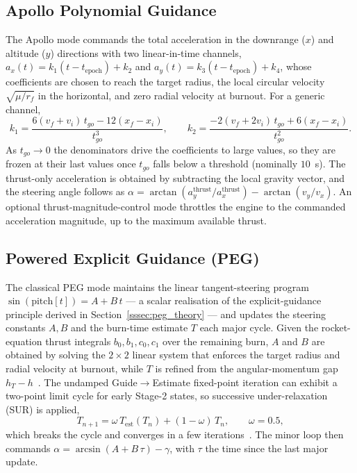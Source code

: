 \subsection{Apollo Polynomial Guidance}
\label{ssec:apollo}

The Apollo mode commands the total acceleration in the downrange ($x$) and
altitude ($y$) directions with two linear-in-time channels,
$a_x(t)=k_1(t-t_{\mathrm{epoch}})+k_2$ and
$a_y(t)=k_3(t-t_{\mathrm{epoch}})+k_4$, whose coefficients are chosen to reach
the target radius, the local circular velocity $\sqrt{\mu/r_f}$ in the horizontal,
and zero radial velocity at burnout. For a generic channel,
\begin{equation}
  k_1 = \frac{6(v_f+v_i)\,t_{go} - 12(x_f-x_i)}{t_{go}^{3}}, \qquad
  k_2 = \frac{-2(v_f+2v_i)\,t_{go} + 6(x_f-x_i)}{t_{go}^{2}}.
  \label{eq:apollo_k}
\end{equation}
As $t_{go}\to0$ the denominators drive the coefficients to large values, so they
are frozen at their last values once $t_{go}$ falls below a threshold (nominally
$10$~s). The thrust-only acceleration is obtained by subtracting the local gravity
vector, and the steering angle follows as
$\alpha=\arctan(a_y^{\mathrm{thrust}}/a_x^{\mathrm{thrust}})-\arctan(v_y/v_x)$. An
optional thrust-magnitude-control mode throttles the engine to the commanded
acceleration magnitude, up to the maximum available thrust.

\subsection{Powered Explicit Guidance (PEG)}
\label{ssec:peg}

The classical PEG mode maintains the linear tangent-steering program
$\sin(\text{pitch}[t]) = A + B\,t$ --- a scalar realisation of the explicit-guidance
principle derived in Section~\ref{sssec:peg_theory} --- and updates the steering
constants $A,B$ and the burn-time estimate $T$ each major cycle. Given the rocket-equation thrust
integrals $b_0,b_1,c_0,c_1$ over the remaining burn, $A$ and $B$ are obtained by
solving the $2\times2$ linear system that enforces the target radius and radial
velocity at burnout, while $T$ is refined from the angular-momentum gap
$h_T-h$~\cite{burden2015numerical}. The undamped Guide$\rightarrow$Estimate
fixed-point iteration can exhibit a two-point limit cycle for early Stage-2
states, so successive under-relaxation (SUR) is applied,
\begin{equation}
  T_{n+1} = \omega\,T_{\mathrm{est}}(T_n) + (1-\omega)\,T_n,
  \qquad \omega=0.5,
  \label{eq:peg_sur}
\end{equation}
which breaks the cycle and converges in a few iterations~\cite{burden2015numerical}.
The minor loop then commands $\alpha=\arcsin(A+B\,\tau)-\gamma$, with $\tau$ the
time since the last major update.

